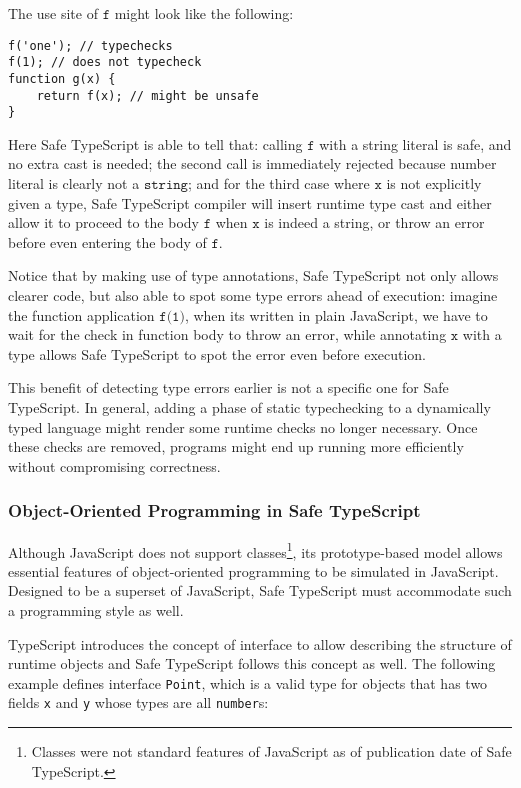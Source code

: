 The use site of $\texttt{f}$ might look like the following:

\begin{verbatim}
f('one'); // typechecks
f(1); // does not typecheck
function g(x) {
    return f(x); // might be unsafe
}
\end{verbatim}

Here Safe TypeScript is able to tell that:
calling $\texttt{f}$ with a string literal
is safe, and no extra cast is needed; the second call is immediately rejected
because number literal is clearly not a $\texttt{string}$;
and for the third case where $\texttt{x}$
is not explicitly given a type, Safe TypeScript compiler will insert runtime type cast
and either allow it to proceed to the body $\texttt{f}$ when $\texttt{x}$ is indeed a string,
or throw an error before even entering the body of $\texttt{f}$.

Notice that by making use of type annotations, Safe TypeScript not only allows
clearer code, but also able to spot some type errors ahead of execution:
imagine the function application $\texttt{f(1)}$, when its written in plain JavaScript,
we have to wait for the check in function body to throw an error,
while annotating $\texttt{x}$ with a type allows Safe TypeScript
to spot the error even before execution.

This benefit of detecting type errors earlier is not a specific one for Safe TypeScript.
In general, adding a phase of static typechecking to a dynamically typed language
might render some runtime checks no longer necessary.
Once these checks are removed,
programs might end up running more efficiently without compromising correctness.


\subsubsection{Object-Oriented Programming in Safe TypeScript}

Although JavaScript does not support classes\footnote{
	Classes were not standard features of JavaScript
	as of publication date of Safe TypeScript.
},
its prototype-based model allows essential features of object-oriented
programming to be simulated in JavaScript.
Designed to be a superset of JavaScript, Safe TypeScript must accommodate such a programming
style as well.

TypeScript introduces the concept of interface to allow describing
the structure of runtime objects and Safe TypeScript follows this concept as well.
The following example defines
interface \texttt{Point}, which is a valid type for objects
that has two fields \texttt{x} and \texttt{y} whose types are all \texttt{number}s:

